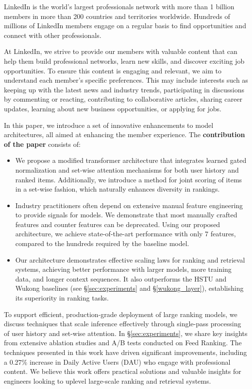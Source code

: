 LinkedIn is the world's largest professionals network with more than 1 billion members in more than 200 countries and territories worldwide. Hundreds of millions of LinkedIn members engage on a regular basis to find opportunities and connect with other professionals.

At LinkedIn, we strive to provide our members with valuable content that can help them build professional networks, learn new skills, and discover exciting job opportunities. To ensure this content is engaging and relevant, we aim to understand each member's specific preferences. This may include interests such as keeping up with the latest news and industry trends, participating in discussions by commenting or reacting, contributing to collaborative articles, sharing career updates, learning about new business opportunities, or applying for jobs.

In this paper, we introduce a set of innovative enhancements
to model architectures, all aimed at enhancing the member experience. 
The \textbf{contribution of the paper} consists of:
\begin{itemize}[leftmargin=*]
    \item We propose a modified transformer architecture that integrates learned gated normalization and set-wise attention mechanisms for both user history and ranked items. Additionally, we introduce a method for joint scoring of items in a set-wise fashion, which naturally enhances diversity in rankings.
    \item Industry practitioners often depend on extensive manual feature engineering to provide signals for models. We demonstrate that most manually crafted features and counter features can be deprecated. Using our proposed architecture, we achieve state-of-the-art performance with only 7 features, compared to the hundreds required by the baseline model.
    \item Our architecture demonstrates effective scaling laws for ranking and retrieval systems, achieving better performance with larger models, more training data, and longer context sequences. It also outperforms the HSTU\cite{HSTU_paper_zhai24a} and Wukong\cite{zhang2024wukongscalinglawlargescale} baselines (see \S\ref{sec:experiments} and \S\ref{wukong_layer}), establishing its superiority in ranking tasks.   
\end{itemize}

To support efficient, production-grade deployment of large ranking models, we discuss techniques that scale inference effectively through single-pass processing of user history and set-wise attention. In \S\ref{sec:experiments}, we share key insights from extensive ablation studies and A/B tests conducted on Feed Ranking. The techniques presented in this work have driven significant improvements, including a 0.27\% increase in Daily Active Users (DAU) who engage with professional content. We believe this work offers practical solutions and valuable insights for engineers looking to uplevel large-scale ranking and retrieval systems.

\vspace{-0.3em}